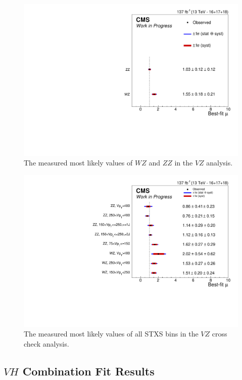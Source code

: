 \begin{figure}
  \centering
  \includegraphics[width=0.8\linewidth]{figures/210404_VZ_unblinded_XbbVZ_df06b22d_a866aef8/summary_stxs.pdf}
  \caption[Measured values of $W\!Z$ and $Z\!Z$]{
    The measured most likely values of $W\!Z$ and $Z\!Z$ in the
    $V\!Z$ analysis.
  }
  \label{fig:vz-wzzz}
\end{figure}

\begin{figure}
  \centering
  \includegraphics[width=0.8\linewidth]{figures/210308_STXS_VZ_unblinded_XbbVZ_e4179c95_a866aef8/summary_stxs.pdf}
  \caption[Measured STXS values of $V\!Z$]{
    The measured most likely values of all STXS bins in the
    $V\!Z$ cross check analysis.
  }
  \label{fig:vz-stxs}
\end{figure}

\subsection{$V\!H$ Combination Fit Results}

